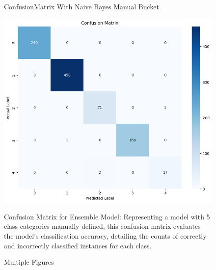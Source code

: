 \documentclass{article}
\begin{document}
\begin{figure}[htbp]
       \begin{minipage}{\textwidth}
        \centering
        \caption{ConfusionMatrix With Naive Bayes Manual Bucket}
        \includegraphics[scale=0.5]{Simplified Matrix by string class.png}
    \end{minipage}
    Confusion Matrix for Ensemble Model: Representing a model with 5 class categories manually defined, this confusion matrix evaluates the model's classification accuracy, detailing the counts of correctly and incorrectly classified instances for each class.
    \caption{Multiple Figures}
\end{figure}
\end{document}
